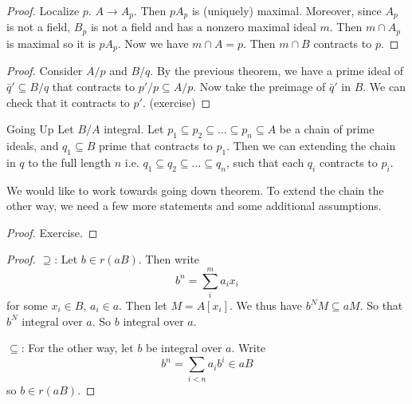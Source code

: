 \begin{proof}
    Localize $p$. $A\to A_p$. Then $p A_p$ is (uniquely) maximal. Moreover, since $A_p$ is not a field, $B_p$ is not a field and has a nonzero maximal ideal $m$. Then $m\cap A_p$ is maximal so it is $p A_p$. Now we have $m\cap A = p $. Then $m\cap B$ contracts to $p$.
\end{proof}
\begin{proof}
    Consider $A/p$ and $B/q$. By the previous theorem, we have a prime ideal of $\bar{q}'\subseteq B/q$ that contracts to $p'/p\subseteq A/p$. Now take the preimage of $\bar{q}'$ in $B$. We can check that it contracts to $p'$. (exercise)
\end{proof}
\begin{acorollary}{Going Up}{}
    Let $B/A$ integral.
    Let $p_1\subseteq p_2\subseteq...\subseteq p_n\subseteq A$ be a chain of prime ideals, and $q_1\subseteq B$ prime that contracts to $p_1$. Then we can extending the chain in $q$ to the full length $n$ i.e. $q_1\subseteq q_2\subseteq ...\subseteq q_n$, such that each $q_i$ contracts to $p_i$.
\end{acorollary}

We would like to work towards going down theorem. To extend the chain the other way, we need a few more statements and some additional assumptions.


\begin{proof}
    Exercise.
\end{proof}


\begin{proof}
    $\supseteq$: Let $b\in r(aB)$. Then write \[
     b^n= \sum_{i}^m a_i x_i
    \]
    for some $x_i\in B$, $a_i\in a$. 
    Then let $M=A[x_i]$. We thus have $b^NM \subseteq aM$. So that $b^N$ integral over $a$. So $b$ integral over $a$.

    $\subseteq$: For the other way, let $b$ be integral over $a$. Write \[
    b^n = \sum_{i<n} a_i b^i \in aB
    \] so $b\in r(aB)$.
\end{proof}